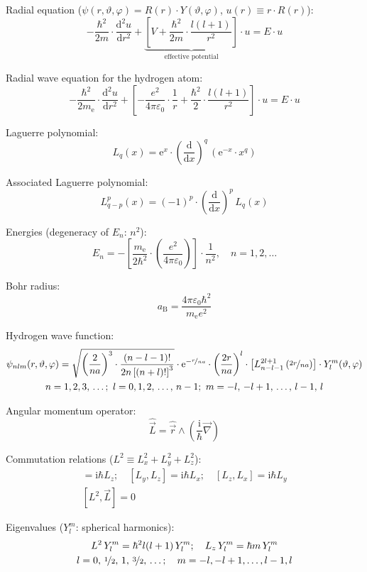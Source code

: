 \documentclass[fontsize=11pt,a4paper]{scrartcl}
\begin{document}
Radial equation ($\psi(r,\vartheta,\varphi)=R(r)\cdot Y(\vartheta,\varphi)$, $u(r)\equiv r\cdot R(r)$):
\[
	-\frac{\hbar^2}{2m}\cdot\frac{\mathrm{d}^2 u}{\mathrm{d}r^2}
		+ \underbrace{\left[V+\frac{\hbar^2}{2m}\cdot\frac{l(l+1)}{r^2}\right]}_\text{effective potential}\cdot u = E\cdot u
\]

Radial wave equation for the hydrogen atom:
\[
	-\frac{\hbar^2}{2m_\mathrm{e}}\cdot\frac{\mathrm{d}^2 u}{\mathrm{d}r^2}
		+\left[-\frac{e^2}{4\pi\varepsilon_0}\cdot\frac{1}{r}+\frac{\hbar^2}{2}\cdot\frac{l(l+1)}{r^2}\right]\cdot u=E\cdot u
\]

Laguerre polynomial:
\[
	L_q(x)=\mathrm{e}^x\cdot\left(\frac{\mathrm{d}}{\mathrm{d}x}\right)^q\,\left(\mathrm{e}^{-x}\cdot x^q\right)
\]

Associated Laguerre polynomial:
\[
	L_{q-p}^p(x)=(-1)^p\cdot\left(\frac{\mathrm{d}}{\mathrm{d}x}\right)^p\,L_q(x)
\]

Energies (degeneracy of $E_n$: $n^2$):
\[
	E_n=-\left[\frac{m_\mathrm{e}}{2\hbar ^2}\cdot\left(\frac{e^2}{4\pi\varepsilon_0}\right)\right]\cdot\frac{1}{n^2},\quad n=1,2,\dots
\]

Bohr radius:
\[
	a_\mathrm{B}=\frac{4\pi\varepsilon_0\hbar^2}{m_\mathrm{e}e^2}
\]

Hydrogen wave function:
\begin{gather*}
	\psi_{nlm}(r,\vartheta,\varphi)=
		\sqrt{\left(\frac{2}{na}\right)^3\cdot\frac{(n-l-1)!}{2n\left[(n+l)!\right]^3}}
		\cdot\mathrm{e}^{-\nicefrac{r}{na}}\cdot\left(\frac{2r}{na}\right)^l
		\cdot\left[L_{n-l-1}^{2l+1}\left(\nicefrac{2r}{na}\right)\right]\cdot Y_l^m(\vartheta,\varphi)\\
	n=1,2,3,\,\dots;\,\,l=0,1,2,\,\dots,\,n-1;\,\,m=-l,\,-l+1,\,\dots,\,l-1,\,l
\end{gather*}

Angular momentum operator:
\[
	\hat{\vec L}=\hat{\vec r}\wedge\left(\frac{\mathrm{i}}{\hbar}\vec\nabla\right)
\]

Commutation relations ($L^2\equiv L_x^2+L_y^2+L_z^2$):
\begin{gather*}
	[L_x,L_y]=\mathrm{i}\hbar L_z;
		\quad[L_y,L_z]=\mathrm{i}\hbar L_x;
		\quad[L_z,L_x]=\mathrm{i}\hbar L_y\\
	[L^2,\vec L]=0
\end{gather*}

Eigenvalues ($Y_l^m$: spherical harmonics):
\begin{gather*}
	L^2\, Y_l^m=\hbar^2l(l+1)\,Y_l^m;\quad
		L_z\,Y_l^m=\hbar m\,Y_l^m\\
	l=0,\,\nicefrac{1}{2},\,1,\,\nicefrac{3}{2},\,\dots;\quad
		m=-l,-l+1,\dots,l-1,l
\end{gather*}
\end{document}
